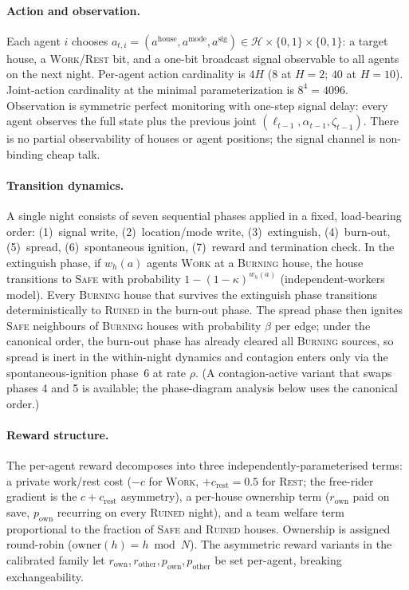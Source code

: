 \documentclass{anvil-paper}
\begin{document}
\paragraph{Action and observation.}
Each agent $i$ chooses
$a_{t,i}{=}(a^{\text{house}},a^{\text{mode}},a^{\text{sig}})\in
\mathcal{H}\times\{0,1\}\times\{0,1\}$: a target house, a
\textsc{Work}/\textsc{Rest} bit, and a one-bit broadcast signal observable to
all agents on the next night. Per-agent action cardinality is $4H$ ($8$ at
$H{=}2$; $40$ at $H{=}10$). Joint-action cardinality at the minimal
parameterization is $8^4{=}4096$. Observation is symmetric perfect monitoring
with one-step signal delay: every agent observes the full state plus the
previous joint $(\ell_{t-1},\alpha_{t-1},\zeta_{t-1})$. There is no partial
observability of houses or agent positions; the signal channel is
non-binding cheap talk.

\paragraph{Transition dynamics.}
A single night consists of seven sequential phases applied in a fixed,
load-bearing order: (1)~signal write, (2)~location/mode write,
(3)~extinguish, (4)~burn-out, (5)~spread, (6)~spontaneous ignition,
(7)~reward and termination check. In the extinguish phase, if $w_h(a)$
agents \textsc{Work} at a \textsc{Burning} house, the house transitions to
\textsc{Safe} with probability $1-(1-\kappa)^{w_h(a)}$ (independent-workers
model). Every \textsc{Burning} house that survives the extinguish phase
transitions deterministically to \textsc{Ruined} in the burn-out phase. The
spread phase then ignites \textsc{Safe} neighbours of \textsc{Burning}
houses with probability $\beta$ per edge; under the canonical order, the
burn-out phase has already cleared all \textsc{Burning} sources, so spread is
inert in the within-night dynamics and contagion enters only via the
spontaneous-ignition phase~6 at rate $\rho$. (A contagion-active variant
that swaps phases 4 and 5 is available; the phase-diagram analysis below
uses the canonical order.)

\paragraph{Reward structure.}
The per-agent reward decomposes into three independently-parameterised terms:
a private work/rest cost ($-c$ for \textsc{Work}, $+c_{\text{rest}}{=}0.5$
for \textsc{Rest}; the free-rider gradient is the $c{+}c_{\text{rest}}$
asymmetry), a per-house ownership term ($r_{\text{own}}$ paid on save,
$p_{\text{own}}$ recurring on every \textsc{Ruined} night), and a team
welfare term proportional to the fraction of \textsc{Safe} and
\textsc{Ruined} houses. Ownership is assigned round-robin
($\text{owner}(h){=}h\bmod N$). The asymmetric reward variants in the
calibrated family let $r_{\text{own}},r_{\text{other}},p_{\text{own}},
p_{\text{other}}$ be set per-agent, breaking exchangeability.
\end{document}
